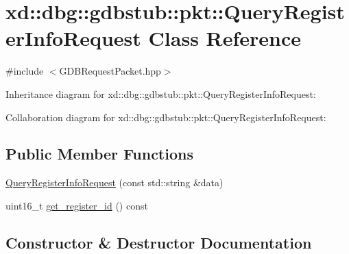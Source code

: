 \hypertarget{classxd_1_1dbg_1_1gdbstub_1_1pkt_1_1_query_register_info_request}{}\section{xd\+:\+:dbg\+:\+:gdbstub\+:\+:pkt\+:\+:Query\+Register\+Info\+Request Class Reference}
\label{classxd_1_1dbg_1_1gdbstub_1_1pkt_1_1_query_register_info_request}


{\ttfamily \#include $<$G\+D\+B\+Request\+Packet.\+hpp$>$}



Inheritance diagram for xd\+:\+:dbg\+:\+:gdbstub\+:\+:pkt\+:\+:Query\+Register\+Info\+Request\+:


Collaboration diagram for xd\+:\+:dbg\+:\+:gdbstub\+:\+:pkt\+:\+:Query\+Register\+Info\+Request\+:
\subsection*{Public Member Functions}
\begin{DoxyCompactItemize}
\item 
\mbox{\hyperlink{classxd_1_1dbg_1_1gdbstub_1_1pkt_1_1_query_register_info_request_a1dc1a7736ad5080c50f3b553484cbf5b}{Query\+Register\+Info\+Request}} (const std\+::string \&data)
\item 
uint16\+\_\+t \mbox{\hyperlink{classxd_1_1dbg_1_1gdbstub_1_1pkt_1_1_query_register_info_request_a270a7fa5224fd98877ffe82c6fcc882f}{get\+\_\+register\+\_\+id}} () const
\end{DoxyCompactItemize}


\subsection{Constructor \& Destructor Documentation}
\mbox{\label{classxd_1_1dbg_1_1gdbstub_1_1pkt_1_1_query_register_info_request_a1dc1a7736ad5080c50f3b553484cbf5b}} 

